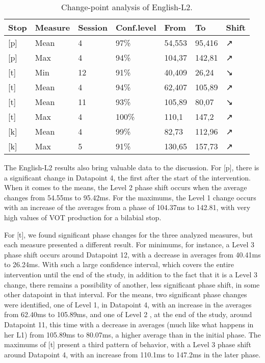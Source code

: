 \begin{table}[h]
\caption{Change-point analysis of English-L2.}\label{laura-table02}
\begin{tabular}{@{}lllllll@{}}
\toprule
\textbf{Stop} & \textbf{Measure} & \textbf{Session} & \textbf{Conf.level} & \textbf{From} & \textbf{To} & \textbf{Shift} \\
\midrule 
{[}p{]} & Mean & 4 & 97\% & 54,553 & 95,416 & ↗ \\
{[}p{]} & Max & 4 & 94\% & 104,37 & 142,81 & ↗ \\
{[}t{]} & Min & 12 & 91\% & 40,409 & 26,24 & ↘ \\
{[}t{]} & Mean & 4 & 94\% & 62,407 & 105,89 & ↗ \\
{[}t{]} & Mean & 11 & 93\% & 105,89 & 80,07 & ↘ \\
{[}t{]} & Max & 4 & 100\% & 110,1 & 147,2 & ↗ \\
{[}k{]} & Mean & 4 & 99\% & 82,73 & 112,96 & ↗ \\
{[}k{]} & Max & 5 & 91\% & 130,65 & 157,73 & ↗ \\
\bottomrule
\end{tabular}
\end{table}

The English-L2 results also bring valuable data to the discussion. For [p],
there is a significant change in Datapoint 4, the first after the start of the
intervention. When it comes to the means, the Level 2 phase shift occurs when
the average changes from 54.55ms to 95.42ms. For the maximums, the Level 1
change occurs with an increase of the averages from a phase of 104.37ms to
142.81, with very high values of VOT production for a bilabial stop.


For [t], we found significant phase changes for the three analyzed measures,
but each measure presented a different result. For minimums, for instance, a
Level 3 phase shift occurs around Datapoint 12, with a decrease in averages
from 40.41ms to 26.24ms. With such a large confidence interval, which covers
the entire intervention until the end of the study, in addition to the fact
that it is a Level 3 change, there remains a possibility of another, less
significant phase shift, in some other datapoint in that interval. For the
means, two significant phase changes were identified, one of Level 1, in
Datapoint 4, with an increase in the averages from 62.40ms to 105.89ms, and one
of Level 2 , at the end of the study, around Datapoint 11, this time with a
decrease in averages (much like what happens in her L1) from 105.89ms to
80.07ms, a higher average than in the initial phase. The maximums of [t]
present a third pattern of behavior, with a Level 3 phase shift around
Datapoint 4, with an increase from 110.1ms to 147.2ms in the later phase.

